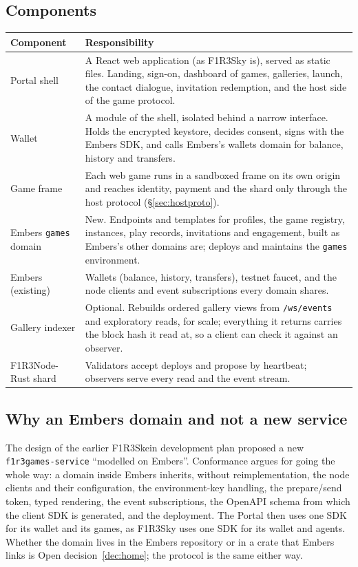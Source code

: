 \documentclass[11pt]{article}
\theoremstyle{definition}
\theoremstyle{remark}
\newcommand{\code}[1]{\texttt{#1}}
\newcommand{\Nd}{F1R3Node-Rust}
\newcommand{\Em}{Embers}
\newcommand{\Sky}{F1R3Sky}
\begin{document}
\subsection{Components}

\begin{longtable}{@{}>{\raggedright\arraybackslash}p{}>{\raggedright\arraybackslash}p{}@{}}
\toprule
Component & Responsibility\\
\midrule
\endhead
Portal shell & A React web application (as \Sky{} is), served as static files.
Landing, sign-on, dashboard of games, galleries, launch, the contact dialogue,
invitation redemption, and the host side of the game protocol.\\
Wallet & A module of the shell, isolated behind a narrow interface. Holds the
encrypted keystore, decides consent, signs with the \Em{} SDK, and calls \Em{}'s
wallets domain for balance, history and transfers.\\
Game frame & Each web game runs in a sandboxed frame on its own origin and reaches
identity, payment and the shard only through the host protocol
(\S\ref{sec:hostproto}).\\
\Em{} \code{games} domain & New. Endpoints and templates for profiles, the game
registry, instances, play records, invitations and engagement, built as \Em{}'s other
domains are; deploys and maintains the \code{games} environment.\\
\Em{} (existing) & Wallets (balance, history, transfers), testnet faucet, and the
node clients and event subscriptions every domain shares.\\
Gallery indexer & Optional. Rebuilds ordered gallery views from \code{/ws/events}
and exploratory reads, for scale; everything it returns carries the block hash it
read at, so a client can check it against an observer.\\
\Nd{} shard & Validators accept deploys and propose by heartbeat; observers serve
every read and the event stream.\\
\bottomrule
\end{longtable}

\subsection{Why an \Em{} domain and not a new service}

The design of the earlier F1R3Skein development plan proposed a new
\code{f1r3games-service} ``modelled on \Em{}''. Conformance argues for going the
whole way: a domain inside \Em{} inherits, without reimplementation, the node
clients and their configuration, the environment-key handling, the prepare/send
token, typed rendering, the event subscriptions, the OpenAPI schema from which the
client SDK is generated, and the deployment. The Portal then uses one SDK for its
wallet and its games, as \Sky{} uses one SDK for its wallet and agents. Whether the
domain lives in the \Em{} repository or in a crate that \Em{} links is Open
decision~\ref{dec:home}; the protocol is the same either way.
\end{document}
